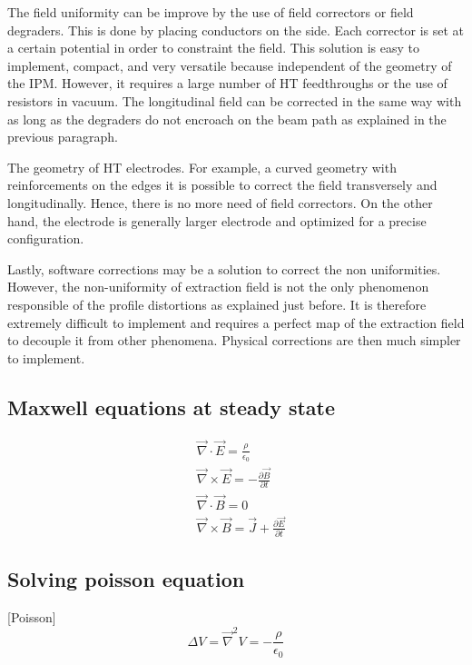 \begin{refsection}
  The field uniformity can be improve by the use of field correctors or field degraders. This is done by placing conductors on the side. Each corrector is set at a certain potential in order to constraint the field. This solution is easy to implement, compact, and very versatile because independent of the geometry of the IPM. However, it requires a large number of HT feedthroughs or the use of resistors in vacuum. The longitudinal field can be corrected in the same way with as long as the degraders do not encroach on the beam path as explained in the previous paragraph.

  The geometry of HT electrodes. For example, a curved geometry with reinforcements on the edges it is possible to correct the field transversely and longitudinally. Hence, there is no more need of field correctors. On the other hand, the electrode is generally larger electrode and optimized for a precise configuration.

  Lastly, software corrections may be a solution to correct the non uniformities. However, the non-uniformity of extraction field is not the only phenomenon responsible of the profile distortions as explained just before. It is therefore extremely difficult to implement and requires a perfect map of the extraction field to decouple it from other phenomena. Physical corrections are then much simpler to implement.

	\subsection{Maxwell equations at steady state}
	\begin{align}
		 & \overrightarrow{\nabla} \cdot \overrightarrow{E} = \frac{\rho}{\epsilon_{0}}                                            \\
		 & \overrightarrow{\nabla} \times \overrightarrow{E} = - \frac{\partial \overrightarrow{B}}{\partial t}                    \\
		 & \overrightarrow{\nabla} \cdot \overrightarrow{B} = 0                                                                    \\
		 & \overrightarrow{\nabla} \times \overrightarrow{B} = \overrightarrow{J} + \frac{\partial \overrightarrow{E}}{\partial t}
	\end{align}

	\subsection{Solving poisson equation}
	[Poisson]
	\begin{equation}
		\Delta V = \overrightarrow{\nabla}^{2}V = -\frac{\rho}{\epsilon_{0}}
	\end{equation}


\end{refsection}
